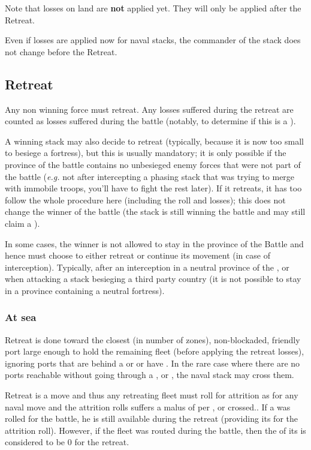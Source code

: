 Note that losses on land are \textbf{not} applied yet. They will only be
applied after the Retreat.

Even if losses are applied now for naval stacks, the commander of the stack
does not change before the Retreat.

\subsection{Retreat}
\label{chMilitary:Battle:Retreat}
Any non winning force must retreat. Any losses suffered during the retreat are
counted as losses suffered during the battle (notably, to determine if this is
a ).

A winning stack may also decide to retreat (typically, because it is now too
small to besiege a fortress), but this is usually mandatory; it is only
possible if the province of the battle contains no unbesieged enemy forces
that were not part of the battle (\emph{e.g.} not after intercepting a phasing
stack that was trying to merge with immobile troops, you'll have to fight the
rest later). If it retreats, it has too follow the whole procedure here
(including the roll and losses); this does not change the winner of the battle
(the stack is still winning the battle and may still claim a ).

In some cases, the winner is not allowed to stay in the province of the Battle
and hence must choose to either retreat or continue its movement (in case of
interception). Typically, after an interception in a neutral province of the
\HRE, or when attacking a stack besieging a third party country (it is not
possible to stay in a province containing a neutral fortress).

\subsubsection{At sea}
Retreat is done toward the closest (in number of zones), non-blockaded,
friendly port large enough to hold the remaining fleet (before applying the
retreat losses), ignoring ports that are behind a \Presidio or \StraitFort or
have \USURE. In the rare case where there are no ports reachable without going
through a \Presidio, \StraitFort or \USURE, the naval stack may cross them.

Retreat is a move and thus any retreating fleet must roll for attrition as for
any naval move and the attrition rolls suffers a malus of  per
\Presidio, \StraitFort or \USURE crossed.. If a  \LeaderA
was rolled for the battle, he is still available during the retreat (providing
its \Man for the attrition roll). However, if the fleet was routed during the
battle, then the \Man of its \LeaderA is considered to be 0 for the retreat.

